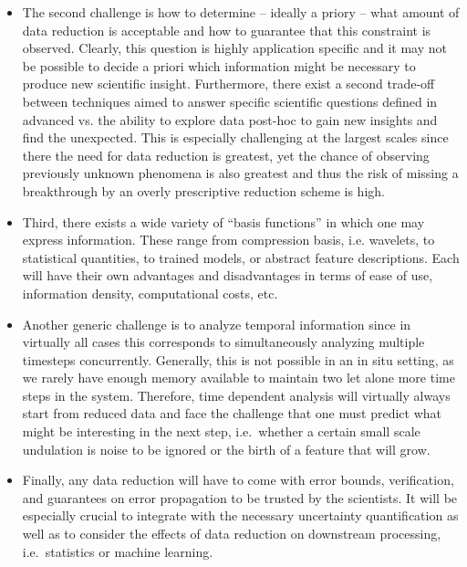 \begin{refsection}
\begin{itemize}
\item
The second challenge is how to determine -- ideally a priory -- what amount of data reduction is acceptable and how to guarantee that this constraint is observed. Clearly, this question is highly application specific and it may not be possible to decide a priori which information might be necessary to produce new scientific insight. Furthermore, there exist a second trade-off between techniques aimed to answer specific scientific questions defined in advanced vs. the ability to explore data post-hoc to gain new insights and find the unexpected. This is especially challenging at the largest scales since there the need for data reduction is greatest, yet the chance of observing previously unknown phenomena is also greatest and thus the risk of missing a breakthrough by an overly prescriptive reduction scheme is high.

\item
Third, there exists a wide variety of “basis functions” in which one may express information. These range from compression basis, i.e. wavelets, to statistical quantities, to trained models, or abstract feature descriptions. Each will have their own advantages and disadvantages in terms of ease of use, information density, computational costs, etc.

\item
Another generic challenge is to analyze temporal information since in virtually all cases this corresponds to simultaneously analyzing multiple timesteps concurrently. Generally, this is not possible in an in situ setting, as we rarely have enough memory available to maintain two let alone more time steps in the system. Therefore, time dependent analysis will virtually always start from reduced data and face the challenge that one must predict what might be interesting in the next step, i.e.\ whether a certain small scale undulation is noise to be ignored or the birth of a feature that will grow.

\item
Finally, any data reduction will have to come with error bounds, verification, and guarantees on error propagation to be trusted by the scientists. It will be especially crucial to integrate with the necessary uncertainty quantification as well as to consider the effects of data reduction on downstream processing, i.e.\ statistics or machine learning.
\end{itemize}


\end{refsection}
